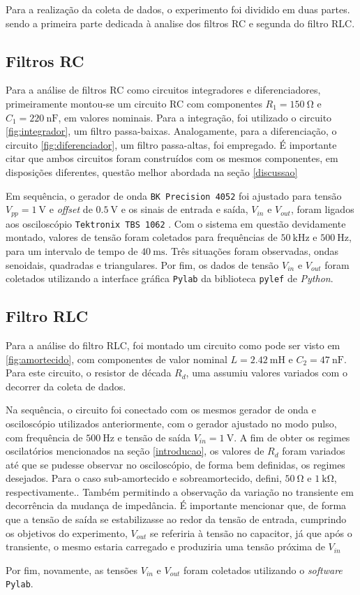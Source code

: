 Para a realização da coleta de dados, o experimento foi dividido em duas partes. sendo a primeira parte dedicada à analise dos filtros RC e segunda do filtro RLC.

\subsection{Filtros RC}

    Para a análise de filtros RC como circuitos integradores e diferenciadores, primeiramente montou-se um circuito RC com componentes $R_1=\SI{150}{\ohm}$ e $C_1=\SI{220}{\nano\farad}$, em valores nominais. Para a integração, foi utilizado o circuito \ref{fig:integrador}, um filtro passa-baixas. Analogamente, para a diferenciação, o circuito \ref{fig:diferenciador}, um filtro passa-altas, foi empregado. É importante citar que ambos circuitos foram construídos com os mesmos componentes, em disposições diferentes, questão melhor abordada na seção \ref{discussao}
    
    Em sequência, o gerador de onda \texttt{BK Precision 4052} \cite{ref:gerador} foi ajustado para tensão $V_{pp}=\SI{1}{\volt}$ e \textit{offset} de $\SI{0,5}{\volt}$ e os sinais de entrada e saída, $V_{in}$ e $V_{out}$, foram ligados aos osciloscópio \texttt{Tektronix TBS 1062} \cite{ref:osciloscopio}. Com o sistema em questão devidamente montado, valores de tensão foram coletados para frequências de $\SI{50}{\kilo\hertz}$ e $\SI{500}{\hertz}$, para um intervalo de tempo de $\SI{40}{\milli\second}$. Três situações foram observadas, ondas senoidais, quadradas e triangulares. Por fim, os dados de tensão $V_{in}$ e $V_{out}$ foram coletados utilizando a interface gráfica \texttt{Pylab} da biblioteca  \texttt{pylef}\cite{ref:pylef} de \textit{Python}.

\subsection{Filtro RLC}

    Para a análise do filtro RLC, foi montado um circuito como pode ser visto em \ref{fig:amortecido}, com componentes de valor nominal $L=\SI{2,42}{\milli\henry}$ e $C_{2}=\SI{47}{\nano\farad}$. Para este circuito, o resistor de década $R_{d}$, uma assumiu valores variados com o decorrer da coleta de dados.
    
    Na sequência, o circuito foi conectado com os mesmos gerador de onda e osciloscópio utilizados anteriormente, com o gerador ajustado no modo pulso, com frequência de $\SI{500}{\hertz}$ e tensão de saída $V_{in}=\SI{1}{\volt}$. A fim de obter os regimes oscilatórios mencionados na seção \ref{introducao}, os valores de $R_d$ foram variados até que se pudesse observar no osciloscópio, de forma bem definidas, os regimes desejados. Para o caso sub-amortecido e sobreamortecido, defini, $\SI{50}{\ohm}$ e $\SI{1}{\kilo\ohm}$, respectivamente.. Também permitindo a observação da variação no transiente em decorrência da mudança de impedância.  É importante mencionar que, de forma que a tensão de saída se estabilizasse ao redor da tensão de entrada, cumprindo os objetivos do experimento, $V_{out}$ se referiria à tensão no capacitor, já que após o transiente, o mesmo estaria carregado e produziria uma tensão próxima de $V_{in}$

    Por fim, novamente, as tensões $V_{in}$ e $V_{out}$ foram coletados utilizando o \textit{software} \texttt{Pylab}.

    

\pagebreak